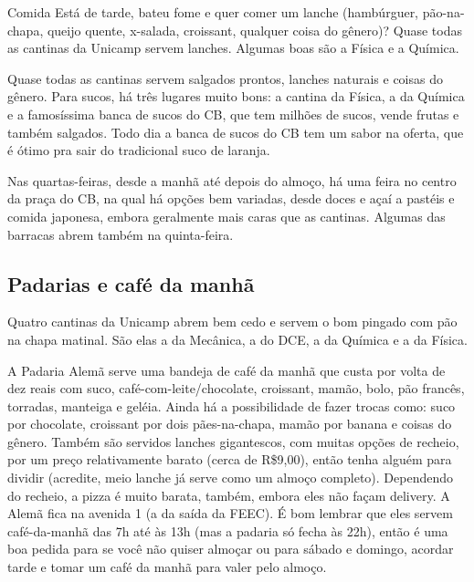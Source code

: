 \begin{story}{Comida}
Está de tarde, bateu fome e quer comer um lanche (hambúrguer, pão-na-chapa, queijo quente, x-salada, croissant, qualquer coisa do gênero)? Quase todas as cantinas da Unicamp servem lanches. Algumas boas são a Física e a Química.

Quase todas as cantinas servem salgados prontos, lanches naturais e coisas do gênero. Para sucos, há três lugares muito bons: a cantina da Física, a da Química e a famosíssima banca de sucos do CB, que tem milhões de sucos, vende frutas e também salgados. Todo dia a banca de sucos do CB tem um sabor na oferta, que é ótimo pra sair do tradicional suco de laranja.

Nas quartas-feiras, desde a manhã até depois do almoço, há uma feira no centro da praça do CB, na qual há opções bem variadas, desde doces  e açaí a pastéis e comida japonesa, embora geralmente mais caras que as cantinas. Algumas das barracas abrem também na quinta-feira.

\subsection*{Padarias e café da manhã}

Quatro cantinas da Unicamp abrem bem cedo e servem o bom pingado com pão na chapa matinal. São elas a da Mecânica, a do DCE, a da Química e a da Física.

A Padaria Alemã serve uma bandeja de café da manhã que custa por volta de dez reais com suco, café-com-leite/chocolate, croissant, mamão, bolo, pão francês, torradas, manteiga e geléia. Ainda há a possibilidade de fazer trocas como: suco por chocolate, croissant por dois pães-na-chapa, mamão por banana e coisas do gênero. Também são servidos lanches gigantescos, com muitas opções de recheio, por um preço relativamente barato (cerca de R\$9,00), então tenha alguém para dividir (acredite, meio lanche já serve como um almoço completo). Dependendo do recheio, a pizza é muito barata, também, embora eles não façam delivery. A Alemã fica na avenida 1 (a da saída da FEEC). É bom lembrar que eles servem café-da-manhã das 7h até às 13h (mas a padaria só fecha às 22h), então é uma boa pedida para se você não quiser almoçar ou para sábado e domingo, acordar tarde e tomar um café da manhã para valer pelo almoço.


\end{story}
